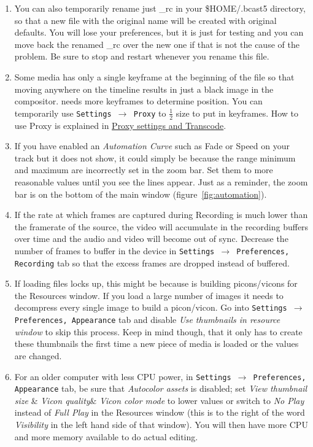 \begin{enumerate}
        \item You can also temporarily rename just \CGG{}\_rc in your \$HOME/.bcast5 directory, so
that a new file with the original name will be created with original defaults.  You will lose your preferences,
but it is just for testing and you can move back the renamed \CGG{}\_rc over the new one if that is not the
cause of the problem.  Be sure to stop and restart \CGG{} whenever you rename this file.
	\item Some media has only a single keyframe at the beginning of the file so that moving anywhere on the timeline results in just a black image in the compositor. \CGG{} needs more keyframes to determine position. You can temporarily use \texttt{Settings $\rightarrow$ Proxy} to $\frac{1}{2}$ size to put in keyframes. How to use Proxy is explained in \href{sec:proxy_settings}{Proxy settings and Transcode}.
        \item If you have enabled an \textit{Automation Curve} such as Fade or Speed on your track but it
does not show, it could simply be because the range minimum and maximum are incorrectly set in the zoom bar.
Set them to more reasonable values until you see the lines appear. Just as a reminder, the zoom bar is on the
bottom of the main window (figure~\ref{fig:automation}). 
 	\item If the rate at which frames are captured during Recording is much lower than the framerate of the source, the video will accumulate in the recording buffers over time and the audio and video will become out of sync. Decrease the number of frames to buffer in the device in \texttt{Settings $\rightarrow $ Preferences, Recording} tab so that the excess frames are dropped instead of buffered.
	\item If loading files locks up, this might be because \CGG{} is building picons/vicons for the Resources window. If you load a large number of images it needs to decompress every single image to build a picon/vicon. Go into \texttt{Settings $\rightarrow$ Preferences, Appearance} tab and disable \textit{Use thumbnails in resource window} to skip this process. Keep in mind though, that it only has to create these thumbnails the first time a new piece of media is loaded or the values are changed.
	\item For an older computer with less CPU power, in \texttt{Settings $\rightarrow$ Preferences, Appearance} tab, be sure that \textit{Autocolor assets }is disabled; set \textit{View thumbnail size} \& \textit{Vicon quality}\& \textit{Vicon color mode} to lower values or switch to \textit{No Play} instead of \textit{Full Play} in the Resources window (this is to the right of the word \textit{Visibility} in the left hand side of that window). You will then have more CPU and more memory available to do actual editing.
\end{enumerate}

